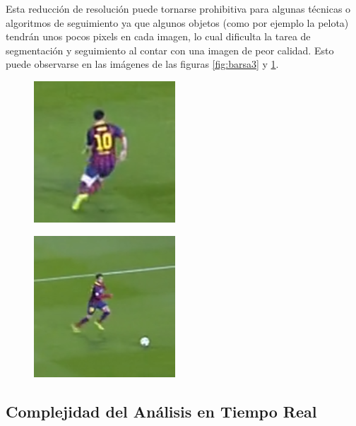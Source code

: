 Esta reducción de resolución puede tornarse prohibitiva para algunas técnicas o
algoritmos de seguimiento ya que algunos objetos (como por ejemplo la pelota)
tendrán unos pocos pixels en cada imagen, lo cual dificulta la tarea de
segmentación y seguimiento al contar con una imagen de peor calidad.  Esto
puede observarse en las imágenes de las figuras \ref{fig:barsa3} y
\ref{fig:barsa4}.

\begin{figure}[H]
    \begin{minipage}[t]{.5\textwidth}
        \centering
        \includegraphics[width=.4\linewidth]{./images/resize_barcelona2.png}
        \label{fig:barsa3}
    \end{minipage}%
    \begin{minipage}[t]{.5\textwidth}
        \centering
        \includegraphics[width=.4\linewidth]{./images/resize_barcelona3.png}
        \label{fig:barsa4}
    \end{minipage}
\end{figure}

\subsection{Complejidad del Análisis en Tiempo Real}

